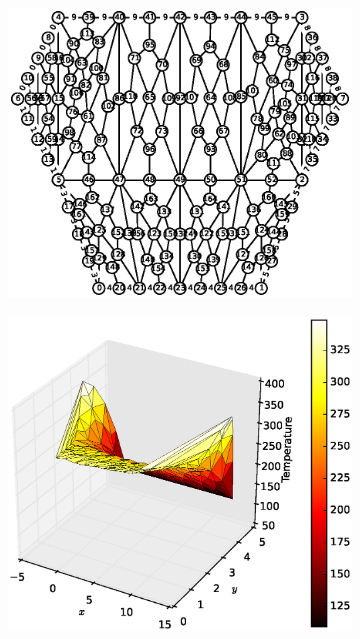 \documentclass[10pt, a4paper]{article}
\begin{document}
\begin{figure}[H]
\centering
	\begin{subfigure}[H]{0.32\textwidth}
		\includegraphics[width=1.3\textwidth]{fig/test4_1.eps}
		\caption{}
		\label{fig:1}
	\end{subfigure}
	\begin{subfigure}[H]{0.33\textwidth}
		\includegraphics[width=\textwidth]{fig/test4_2.eps}
		\caption{}
		\label{fig:2}

\end{subfigure}
\end{figure}
\end{document}
